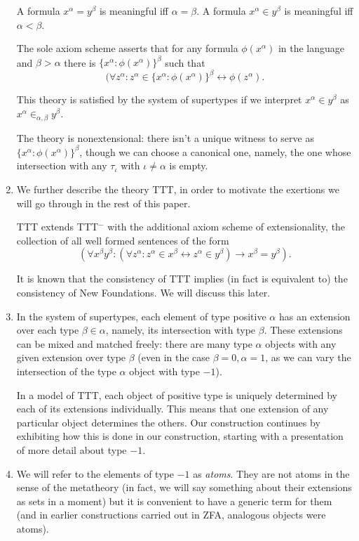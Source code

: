 \documentclass[12pt]{article}
\begin{document}
\begin{enumerate}
A formula $x^\alpha = y^\beta$ is meaningful iff $\alpha=\beta$.  A formula $x^\alpha \in y^\beta$ is meaningful iff $\alpha<\beta$.

The sole axiom scheme asserts that for any formula $\phi(x^\alpha)$ in the language and $\beta>\alpha$ there is $\{x^\alpha:\phi(x^\alpha)\}^\beta$ such that
$$(\forall z^\alpha:z^\alpha \in \{x^\alpha:\phi(x^\alpha)\}^\beta \leftrightarrow \phi(z^\alpha).$$

This theory is satisfied by the system of supertypes if we interpret $x^\alpha \in y^\beta$ as $x^\alpha \in_{\alpha,\beta} y^\beta$.

The theory is nonextensional:  there isn't a unique witness to serve as $\{x^\alpha:\phi(x^\alpha)\}^\beta$, though we can choose a canonical one, namely, the one whose intersection
with any $\tau_\iota$ with $\iota \neq \alpha$ is empty.

\item We further describe the theory TTT, in order to motivate the exertions we will go through in the rest of this paper.

TTT extends TTT$^-$ with the additional axiom scheme of extensionality, the collection of all well formed sentences of the form $$(\forall x^\beta y^\beta:(\forall z^\alpha:z^\alpha \in x^\beta \leftrightarrow z^\alpha \in y^\beta)\rightarrow x^\beta=y^\beta).$$

It is known that the consistency of TTT implies (in fact is equivalent to) the consistency of New Foundations.  We will discuss this later.

\item In the system of supertypes, each element of type positive $\alpha$ has an extension over each type $\beta\in \alpha$, namely, its intersection with type $\beta$.  These extensions can be mixed and matched freely:  there are many type $\alpha$ objects with any given extension over type $\beta$ (even in the case $\beta=0, \alpha=1$, as we can vary the intersection of
the type $\alpha$ object with type $-1$).

 In a model of TTT, each object of positive type is uniquely determined by each of its extensions individually.  This means that one extension of any particular object determines the others.
Our construction continues by exhibiting how this is done in our construction, starting with a presentation of more detail about type $-1$.

\item We will refer to the elements of type $-1$ as {\em atoms\/}.  They are not atoms in the sense of the metatheory (in fact, we will say something about their extensions as sets in a moment) but it is convenient to have a generic term for them (and in earlier constructions carried out in ZFA, analogous objects were atoms).


\end{enumerate}
\end{document}
